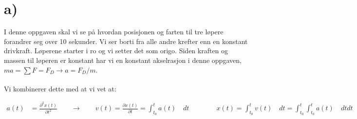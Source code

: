 

\pagebreak


\pagestyle{fancy}
\fancyhf{}

\renewcommand{\headrulewidth}{2pt}
\renewcommand{\footrulewidth}{1pt}











\section*{a)}%

I denne oppgaven skal vi se på hvordan posisjonen og farten til tre løpere forandrer seg over 10 sekunder. Vi ser borti fra alle andre krefter
enn en konstant drivkraft. Løperene starter i ro og vi setter det som origo.
Siden kraften og massen til løperen er konstant har vi en konstant akselrasjon
i denne oppgaven, $ma = \sum F = F_D \rightarrow a = F_D/m$.
\\
\\
Vi kombinerer dette med at vi vet at:

\begin{align*}
  a(t) &= \frac{\partial ^2x(t)}{\partial  t^2}
  \qquad \rightarrow \qquad
  v(t) =\frac{\partial x(t)}{\partial  t} = \int_{t_0}^{t}a(t) \quad dt
  \qquad \qquad
  x(t) = \int_{t_0}^{t}v(t) \quad dt  = \int_{t_0}^{t}\int_{t_0}^{t}a(t) \quad dt dt
\end{align*}


